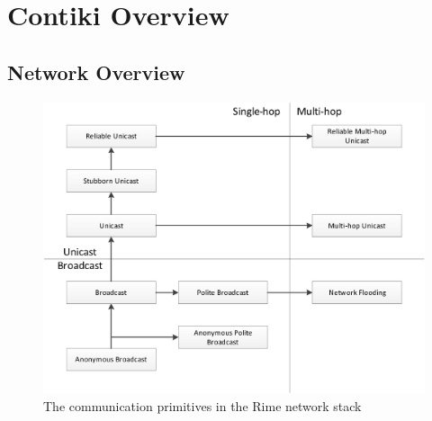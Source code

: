 \section{Contiki Overview}

\subsection{Network Overview}

\begin{figure}[H]
	\centering
	\includegraphics[width=\textwidth]{Diagrams/rime-stack}
	\caption{The communication primitives in the Rime network stack \cite{Dunkels:2007:ACA:1322263.1322295}}
\end{figure}

